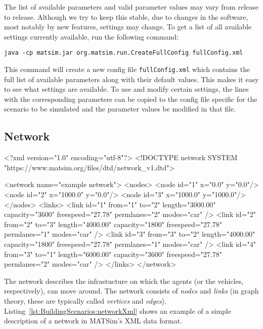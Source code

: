 The list of available parameters and valid parameter values may vary from
release to release. Although we try to keep this stable, due to changes in the
software, most notably by new features, settings may change. To get a list of
all available settings currently available, run the following command:
\begin{lstlisting}
java -cp matsim.jar org.matsim.run.CreateFullConfig fullConfig.xml
\end{lstlisting}
This command will create a new config file {\tt fullConfig.xml} which contains
the full list of available parameters along with their default values. This
makes it easy to see what settings are available. To use and modify certain
settings, the lines with the corresponding parameters can be copied to the
config file specific for the scenario to be simulated and the parameter values
be modified in that file.


\subsection{Network}

\begin{xml-file}[caption=An example of a network.xml,
label=lst:BuildingScenarios:networkXml]
<?xml version="1.0" encoding="utf-8"?>
<!DOCTYPE network SYSTEM "https://www.matsim.org/files/dtd/network_v1.dtd">

<network name="example network">
	<nodes>
		<node id="1" x="0.0" y="0.0"/>
		<node id="2" x="1000.0" y="0.0"/>
		<node id="3" x="1000.0" y="1000.0"/>
	</nodes>
	<links>
		<link id="1" from="1" to="2" length="3000.00" capacity="3600" 
		                           freespeed="27.78" permlanes="2" modes="car" />
		<link id="2" from="2" to="3" length="4000.00" capacity="1800" 
		                           freespeed="27.78" permlanes="1" modes="car" />
		<link id="3" from="3" to="2" length="4000.00" capacity="1800" 
		                           freespeed="27.78" permlanes="1" modes="car" />
		<link id="4" from="3" to="1" length="6000.00" capacity="3600" 
		                           freespeed="27.78" permlanes="2" modes="car" />
	</links>
</network>
\end{xml-file}

The network describes the infrastucture on which the agents (or the vehicles,
respectively), can move around. The network consists of \emph{nodes} and
\emph{links} (in graph theory, these are typically called \emph{vertices} and
\emph{edges}). Listing~\ref{lst:BuildingScenarios:networkXml} shows an example
of a simple description of a network in MATSim's XML data format.

